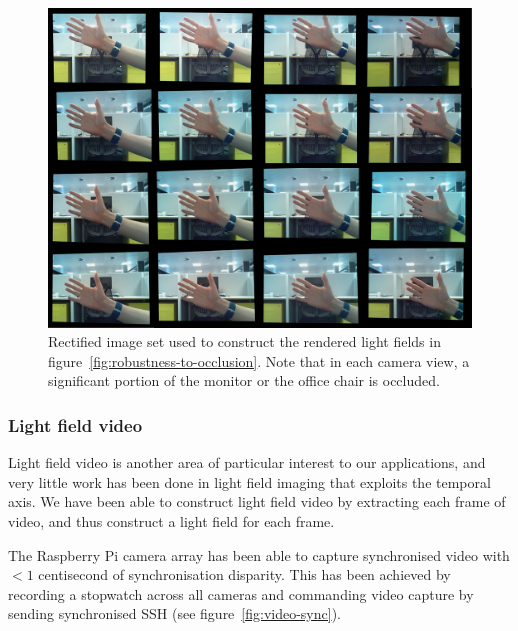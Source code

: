 \documentclass[../main.tex]{subfiles}
\begin{document}
\begin{figure}[H]
    \centering
    \includegraphics[width=\linewidth]{images/occluder-set}
    \caption{Rectified image set used to construct the rendered light fields in figure~\ref{fig:robustness-to-occlusion}. Note that in each camera view, a significant portion of the monitor or the office chair is occluded.}
    \label{fig:occluder-set}
\end{figure}

\newpage
\subsubsection{Light field video}
Light field video is another area of particular interest to our applications, and very little work has been done in light field imaging that exploits the temporal axis. We have been able to construct light field video by extracting each frame of video, and thus construct a light field for each frame.

The Raspberry Pi camera array has been able to capture synchronised video with $<1$ centisecond of synchronisation disparity. This has been achieved by recording a stopwatch across all cameras and commanding video capture by sending synchronised SSH (see figure~\ref{fig:video-sync}).
\end{document}
